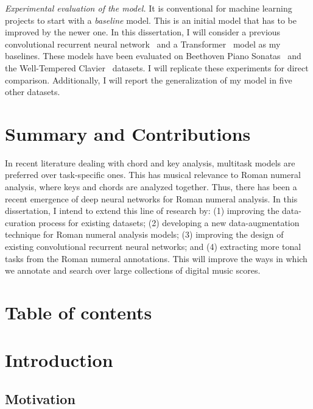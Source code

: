 \documentclass[12pt]{article}
\begin{document}
\emph{Experimental evaluation of the model.}
It is conventional for machine learning projects to start with a \emph{baseline} model.
This is an initial model that has to be improved by the newer one.
In this dissertation, I will consider a previous convolutional recurrent neural network~\cite{micchi2020not} and a Transformer~\cite{chen2021attend} model as my baselines.
These models have been evaluated on Beethoven Piano Sonatas~\cite{chen2018functional} and the Well-Tempered Clavier~\cite{gotham2019romantext} datasets.
I will replicate these experiments for direct comparison.
Additionally, I will report the generalization of my model in five other datasets.

\section*{Summary and Contributions}
In recent literature dealing with chord and key analysis, multitask models are preferred over task-specific ones.
This has musical relevance to Roman numeral analysis, where keys and chords are analyzed together.
Thus, there has been a recent emergence of deep neural networks for Roman numeral analysis.
In this dissertation, I intend to extend this line of research by:
(1) improving the data-curation process for existing datasets;
(2) developing a new data-augmentation technique for Roman numeral analysis models;
(3) improving the design of existing convolutional recurrent neural networks;
and (4) extracting more tonal tasks from the Roman numeral annotations.
This will improve the ways in which we annotate and search over large collections of digital music scores.


{\footnotesize
}

\clearpage

\tableofcontents
{}

\section*{Table of contents}
\section{Introduction}
\subsection{Motivation}
\end{document}
